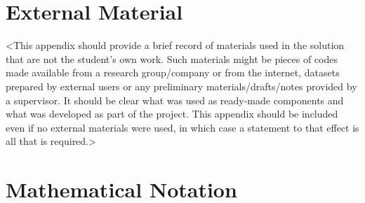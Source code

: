 \begin{appendices}
%
%
\chapter{External Material}
<This appendix should provide a brief record of materials used in the solution that are not the student's own work. Such materials might be pieces of codes made available from a research group/company or from the internet, datasets prepared by external users or any preliminary materials/drafts/notes provided by a supervisor. It should be clear what was used as ready-made components and what was developed as part of the project. This appendix should be included even if no external materials were used, in which case a statement to that effect is all that is required.>




%
%
\chapter{Mathematical Notation}


\end{appendices}
